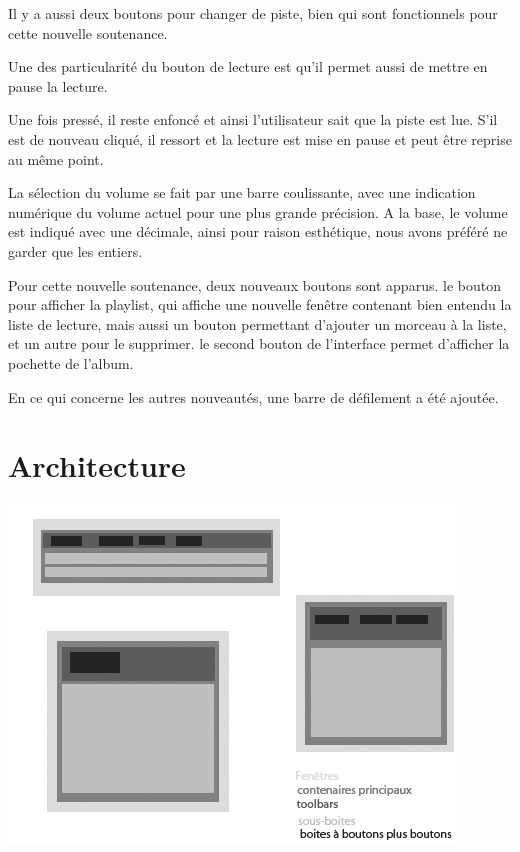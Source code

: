 \documentclass[12pt,a4paper]{report}
\begin{document}
Il y a aussi deux boutons pour changer de piste, bien qui sont fonctionnels pour cette nouvelle soutenance.

Une des particularité du bouton de lecture est qu'il permet aussi de mettre
en pause la lecture.

Une fois pressé, il reste enfoncé et ainsi l'utilisateur sait que la piste est lue. S'il est de nouveau cliqué, il ressort et la lecture est mise en pause et peut être reprise au même point.

La sélection du volume se fait par une barre coulissante, avec une indication
numérique du volume actuel pour une plus grande précision. A la base,
le volume est indiqué avec une décimale, ainsi pour raison esthétique, nous
avons préféré ne garder que les entiers.

Pour cette nouvelle soutenance, deux nouveaux boutons sont apparus.  le bouton pour afficher la playlist, qui affiche une nouvelle fenêtre contenant bien entendu la liste de lecture, mais aussi un bouton permettant d'ajouter un morceau à la liste, et un autre pour le supprimer.
le second bouton de l'interface permet d'afficher la pochette de l'album.

En ce qui concerne les autres nouveautés, une barre de défilement a été ajoutée.

\section{Architecture}



\begin{center}
\includegraphics[scale =0.8]{archi.jpg}
\end{center}
\end{document}
